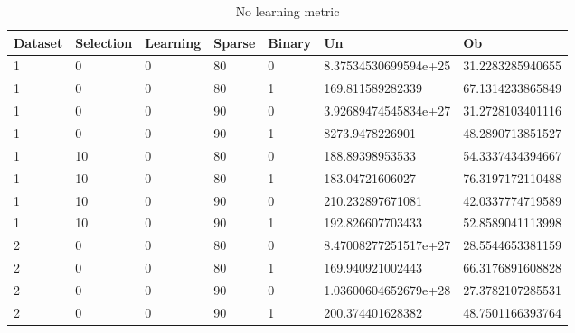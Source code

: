 \documentclass{article}
\theoremstyle{definition}
\begin{document}
\begin{table}[]
\centering
\caption{No learning metric}
\label{my-label}
\begin{tabular}{|l|l|l|l|l|l|l|}
\hline
\textbf{Dataset} & \textbf{Selection} & \textbf{Learning} & \textbf{Sparse} & \textbf{Binary} & \textbf{Un}          & \textbf{Ob}      \\ \hline
1                & 0                  & 0                 & 80              & 0               & 8.37534530699594e+25 & 31.2283285940655 \\ \hline
1                & 0                  & 0                 & 80              & 1               & 169.811589282339     & 67.1314233865849 \\ \hline
1                & 0                  & 0                 & 90              & 0               & 3.92689474545834e+27 & 31.2728103401116 \\ \hline
1                & 0                  & 0                 & 90              & 1               & 8273.9478226901      & 48.2890713851527 \\ \hline
1                & 10                 & 0                 & 80              & 0               & 188.89398953533      & 54.3337434394667 \\ \hline
1                & 10                 & 0                 & 80              & 1               & 183.04721606027      & 76.3197172110488 \\ \hline
1                & 10                 & 0                 & 90              & 0               & 210.232897671081     & 42.0337774719589 \\ \hline
1                & 10                 & 0                 & 90              & 1               & 192.826607703433     & 52.8589041113998 \\ \hline
2                & 0                  & 0                 & 80              & 0               & 8.47008277251517e+27 & 28.5544653381159 \\ \hline
2                & 0                  & 0                 & 80              & 1               & 169.940921002443     & 66.3176891608828 \\ \hline
2                & 0                  & 0                 & 90              & 0               & 1.03600604652679e+28 & 27.3782107285531 \\ \hline
2                & 0                  & 0                 & 90              & 1               & 200.374401628382     & 48.7501166393764 \\ \hline

\end{tabular}
\end{table}
\end{document}
